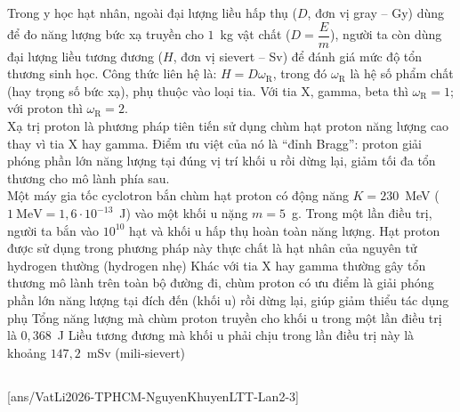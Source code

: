 	\begin{ex}%
		Trong y học hạt nhân, ngoài đại lượng liều hấp thụ ($D$, đơn vị gray -- Gy) dùng để đo năng lượng bức xạ truyền cho $1$~kg vật chất ($D=\dfrac{E}{m}$), người ta còn dùng đại lượng liều tương đương ($H$, đơn vị sievert -- Sv) để đánh giá mức độ tổn thương sinh học. Công thức liên hệ là: $H=D\omega_\text{R}$, trong đó $\omega_\text{R}$ là hệ số phẩm chất (hay trọng số bức xạ), phụ thuộc vào loại tia. Với tia X, gamma, beta thì $\omega_\text{R}=1$; với proton thì $\omega_\text{R}=2$.\\
		Xạ trị proton là phương pháp tiên tiến sử dụng chùm hạt proton năng lượng cao thay vì tia X hay gamma. Điểm ưu việt của nó là ``đỉnh Bragg'': proton giải phóng phần lớn năng lượng tại đúng vị trí khối u rồi dừng lại, giảm tối đa tổn thương cho mô lành phía sau.\\
		Một máy gia tốc cyclotron bắn chùm hạt proton có động năng $K=230$~MeV ($1~\text{MeV}=1{,}6\cdot 10^{-13}$~J) vào một khối u nặng $m=5$~g. Trong một lần điều trị, người ta bắn vào $10^{10}$ hạt và khối u hấp thụ hoàn toàn năng lượng.
		\choiceTFt
		{\True Hạt proton được sử dụng trong phương pháp này thực chất là hạt nhân của nguyên tử hydrogen thường (hydrogen nhẹ)}
		{\True Khác với tia X hay gamma thường gây tổn thương mô lành trên toàn bộ đường đi, chùm proton có ưu điểm là giải phóng phần lớn năng lượng tại đích đến (khối u) rồi dừng lại, giúp giảm thiểu tác dụng phụ}
		{\True Tổng năng lượng mà chùm proton truyền cho khối u trong một lần điều trị là $0{,}368$~J}
		{Liều tương đương mà khối u phải chịu trong lần điều trị này là khoảng $147{,}2$~mSv (mili-sievert)}
	\end{ex}

	\subsection*{}
	\setcounter{ex}{0}
	[ans/VatLi2026-TPHCM-NguyenKhuyenLTT-Lan2-3]

